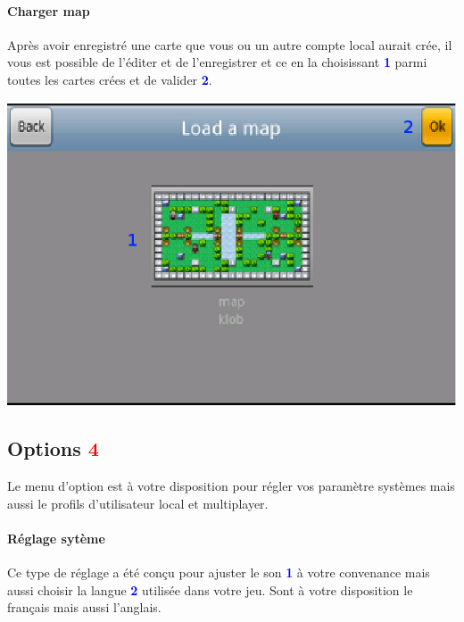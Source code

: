 	\paragraph{Charger map\\}
	Après avoir enregistré une carte que vous ou un autre compte local aurait crée,
	il vous est possible de l'éditer et de l'enregistrer et ce en la choisissant
	\textcolor{blue}{\textbf{1}} parmi toutes les cartes crées et de valider
	\textcolor{blue}{\textbf{2}}. 
	
	\begin{center}
		\includegraphics[scale=0.9]{Manuel/Img/14.eps}
	\end{center}
	

\subsection{Options \textcolor{red}{4}}
	Le menu d'option est à votre disposition pour régler vos paramètre systèmes
	mais aussi le profils d'utilisateur local et multiplayer.
	
	\paragraph{Réglage sytème\\}
	Ce type de réglage a été conçu pour ajuster le son
	\textcolor{blue}{\textbf{1}} à votre convenance mais aussi choisir la langue
	\textcolor{blue}{\textbf{2}} utilisée dans votre jeu. Sont à votre disposition
	le français mais aussi l'anglais.
	
